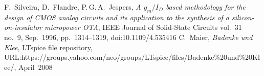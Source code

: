 \documentclass[journal]{IEEEtran}
\begin{document}
\begin{thebibliography}{1}
F.~Silveira, D.~Flandre, P.\,G.\,A.~Jespers,
\textsl{A $g_m/I_D$ based methodology for the design of CMOS analog circuits and its application to the synthesis of a silicon-on-insulator micropower OTA},
IEEE Journal of Solid-State Circuits vol.~31 no.~9, Sep.~1996, pp.~1314--1319,
doi:10.1109/4.535416
C.~Maier, \textsl{Badenke und Klee}, LTspice file repository, URL:{\sf https://groups.yahoo.com/neo/groups/LTspice/files/Badenke\%20und\%20Klee/\/}, April~2008 
\end{thebibliography}
\end{document}
